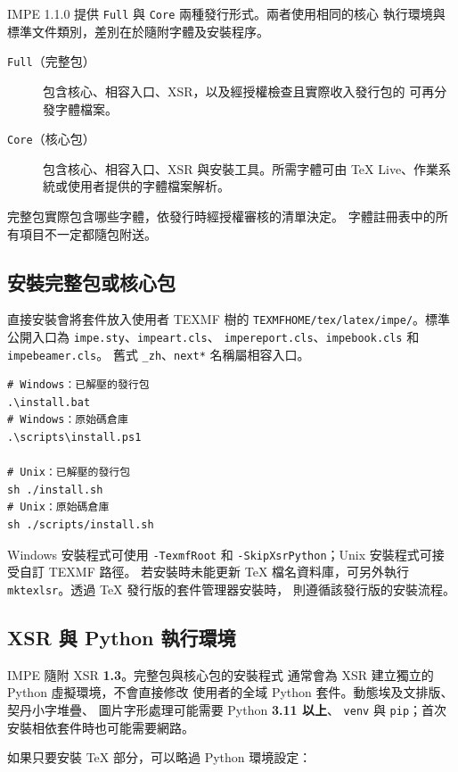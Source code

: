 \documentclass[11pt,lang=zh]{impeart}
\begin{document}
IMPE 1.1.0 提供 \texttt{Full} 與 \texttt{Core} 兩種發行形式。兩者使用相同的核心
\XeLaTeX{} 執行環境與標準文件類別，差別在於隨附字體及安裝程序。

\begin{description}
  \item[\texttt{Full}（完整包）]
    包含核心、相容入口、XSR，以及經授權檢查且實際收入發行包的
    可再分發字體檔案。
  \item[\texttt{Core}（核心包）]
    包含核心、相容入口、XSR 與安裝工具。所需字體可由
    \TeX{} Live、作業系統或使用者提供的字體檔案解析。
\end{description}

完整包實際包含哪些字體，依發行時經授權審核的清單決定。
字體註冊表中的所有項目不一定都隨包附送。

\subsection{安裝完整包或核心包}

直接安裝會將套件放入使用者 TEXMF 樹的
\texttt{TEXMFHOME/tex/latex/impe/}。標準公開入口為
\texttt{impe.sty}、\texttt{impeart.cls}、
\texttt{impereport.cls}、\texttt{impebook.cls}
和 \texttt{impebeamer.cls}。
舊式 \texttt{\_zh}、\texttt{next*} 名稱屬相容入口。

\begin{verbatim}
# Windows：已解壓的發行包
.\install.bat
# Windows：原始碼倉庫
.\scripts\install.ps1

# Unix：已解壓的發行包
sh ./install.sh
# Unix：原始碼倉庫
sh ./scripts/install.sh
\end{verbatim}

Windows 安裝程式可使用 \texttt{-TexmfRoot} 和
\texttt{-SkipXsrPython}；Unix 安裝程式可接受自訂 TEXMF 路徑。
若安裝時未能更新 \TeX{} 檔名資料庫，可另外執行
\texttt{mktexlsr}。透過 \TeX{} 發行版的套件管理器安裝時，
則遵循該發行版的安裝流程。

\subsection{XSR 與 Python 執行環境}

IMPE 隨附 XSR \textbf{1.3}。完整包與核心包的安裝程式
通常會為 XSR 建立獨立的 Python 虛擬環境，不會直接修改
使用者的全域 Python 套件。動態埃及文排版、契丹小字堆疊、
圖片字形處理可能需要 Python \textbf{3.11 以上}、
\texttt{venv} 與 \texttt{pip}；首次安裝相依套件時也可能需要網路。

如果只要安裝 \TeX{} 部分，可以略過 Python 環境設定：
\end{document}
